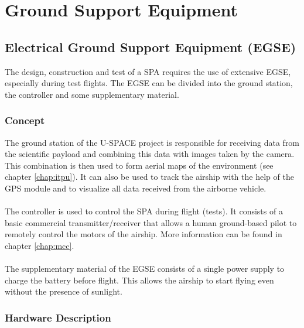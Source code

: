 \chapter{Ground Support Equipment}
\label{chap:ground_support}

\section{Electrical Ground Support Equipment (EGSE)}

The design, construction and test of a \ac{SPA} requires the use of extensive \ac{EGSE}, especially during test flights. The \ac{EGSE} can be divided into the ground station, the controller and some supplementary material.

\subsection{Concept}

The ground station of the \ac{U-SPACE} project is responsible for receiving data from the scientific payload and combining this data with images taken by the camera. This combination is then used to form aerial maps of the environment (see chapter \ref{chap:itpu}). It can also be used to track the airship with the help of the \ac{GPS} module and to visualize all data received from the airborne vehicle.
\\
\\
The controller is used to control the \ac{SPA} during flight (tests). It consists of a basic commercial transmitter/receiver  that allows a human ground-based pilot to remotely control the motors of the airship. More information can be found in chapter \ref{chap:mcc}.
\\
\\
The supplementary material of the \ac{EGSE} consists of a single power supply to charge the battery before flight. This allows the airship to start flying even without the presence of sunlight.

\subsection{Hardware Description}

